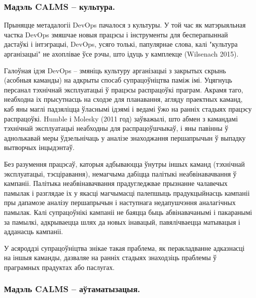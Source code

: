 \vspace{-\baselineskip}
\subsubsection{Мадэль CALMS -- культура.}

Прыняцце метадалогіі DevOps пачалося з культуры.
У той час як матэрыяльная частка DevOps змяшчае новыя працэсы і
інструменты для бесперапыннай дастаўкі і інтэграцыі,
DevOps, усяго толькі, папулярнае слова,
калі "культура арганізацыі" не ахоплівае ўсе рэчы,
што ідуць у камплекце (Wilsenach 2015).

Галоўная ідэя DevOps -- змяніць культуру арганізацыі з
закрытых скрынь (асобныя ка\-ман\-ды) на адкрыты спосаб супрацоўніцтва
паміж імі.
Уцягнуць персанал тэхнічнай эксплуатацыі ў працэсы
распрацоўкі праграм. Акрамя таго, неабходна іх прысутнасць на
сходзе для планавання, агляду праектных каманд, каб яны маглі
падзяліцца ўласнымі ідэямі і ведамі ўжо на ранніх стадыях працэсу
распрацоўкі.
Humble і Molesky (2011 год) заўважылі, што абмен з ка\-ман\-дамі
тэхнічнай эксплуатацыі неабходны для распрацоўшчыкаў, і яны
павінны ў аднолькавай меры ўдзельнічаць у аналізе знаходжання
першапрычын ў выпадку вытворчых інцыдэнтаў.

Без разумення працэсаў, каторыя адбываюцца ўнутры іншых каманд
(тэхнічнай эксплуатацыі, тэсціравання), немагчыма дабіцца
палітыкі неабвінавачвання ў кампаніі.
Палітыка неабвінавачвання прадугледжвае прызнанне чалавечых памылак і
разглядае іх у якасці магчымасці палепшыць прадукцыйнасць кампаніі
пры дапамозе аналізу першапрычын і наступнага недапушчэння
аналагічных памылак.
Калі супрацоўнікі кампаніі не баяцца быць абвінавачанымі і
пакаранымі за памылкі, адкрываецца шлях да новых інавацый,
павялічваецца матывацыя і адданасць кампаніі.

У асяроддзі супрацоўніцтва знікае такая праблема, як перакладванне
адказнасці на іншыя каманды, дазваляе на ранніх стадыях знаходзіць
праблемы ў праграмных прадуктах або паслугах.

\subsubsection{Мадэль CALMS -- аўтаматызацыя.}
